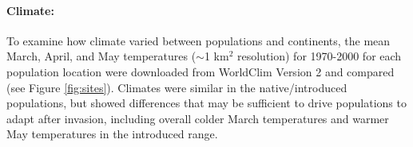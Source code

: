 \documentclass[11pt]{article}\usepackage[]{graphicx}\usepackage[]{color}
\begin{document}
	
	\paragraph{Climate:} 
	To examine how climate varied between populations and continents, the mean March, April, and May temperatures ($\sim$1 km$^2$ resolution) for 1970-2000 for each population location were downloaded from WorldClim Version 2 \parencite{Fick2017} and compared (see Figure \ref{fig:sites}). Climates were similar in the native/introduced populations, but showed differences that may be sufficient to drive populations to adapt after invasion, including overall colder March temperatures and warmer May temperatures in the introduced range. %
	
\end{document}
